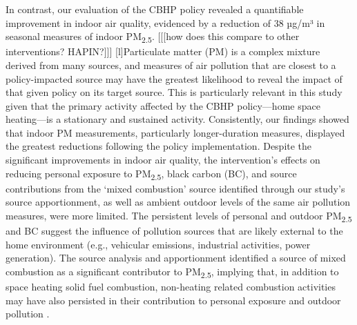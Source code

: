 \documentclass[
  letterpaper,
  DIV=11,
  numbers=noendperiod]{scrartcl}
\begin{document}
In contrast, our evaluation of the CBHP policy revealed a quantifiable
improvement in indoor air quality, evidenced by a reduction of 38 µg/m³
in seasonal measures of indoor PM\textsubscript{2.5}. {[}{[}{[}how does
this compare to other interventions? HAPIN?{]}{]}{]} {[}l{]}Particulate
matter (PM) is a complex mixture derived from many sources, and measures
of air pollution that are closest to a policy-impacted source may have
the greatest likelihood to reveal the impact of that given policy on its
target source. This is particularly relevant in this study given that
the primary activity affected by the CBHP policy---home space
heating---is a stationary and sustained activity. Consistently, our
findings showed that indoor PM measurements, particularly
longer-duration measures, displayed the greatest reductions following
the policy implementation. Despite the significant improvements in
indoor air quality, the intervention's effects on reducing personal
exposure to PM\textsubscript{2.5}, black carbon (BC), and source
contributions from the `mixed combustion' source identified through our
study's source apportionment, as well as ambient outdoor levels of the
same air pollution measures, were more limited. The persistent levels of
personal and outdoor PM\textsubscript{2.5} and BC suggest the influence
of pollution sources that are likely external to the home environment
(e.g., vehicular emissions, industrial activities, power generation).
The source analysis and apportionment identified a source of mixed
combustion as a significant contributor to PM\textsubscript{2.5},
implying that, in addition to space heating solid fuel combustion,
non-heating related combustion activities may have also persisted in
their contribution to personal exposure and outdoor pollution .
\end{document}
